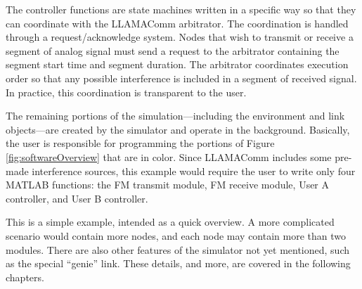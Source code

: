 The controller functions are state machines written in a specific
way so that they can coordinate with the LLAMAComm arbitrator.  The
coordination is handled through a request/acknowledge system.  Nodes
that wish to transmit or receive a segment of analog signal must
send a request to the arbitrator containing the segment start time
and segment duration.  The arbitrator coordinates execution order so
that any possible interference is included in a segment of received
signal.  In practice, this coordination is transparent to the user.

The remaining portions of the simulation---including the environment
and link objects---are created by the simulator and operate in the
background.  Basically, the user is responsible for programming the
portions of Figure \ref{fig:softwareOverview} that are in color.
Since LLAMAComm includes some pre-made interference sources, this
example would require the user to write only four MATLAB functions:
the FM transmit module, FM receive module, User A controller, and
User B controller.

This is a simple example, intended as a quick overview.  A more
complicated scenario would contain more nodes, and each node may
contain more than two modules.  There are also other features of the
simulator not yet mentioned, such as the special ``genie'' link.
These details, and more, are covered in the following chapters.
